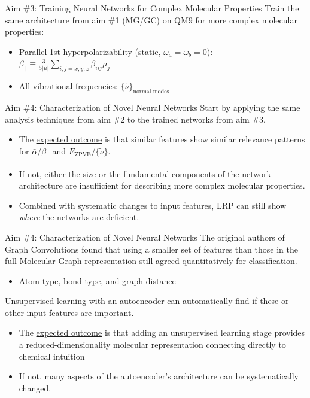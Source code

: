 \documentclass[xetex,compress]{beamer}
\begin{document}

\begin{frame}{Aim \#3: Training Neural Networks for Complex Molecular Properties}
  Train the same architecture from aim \#1 (MG/GC) on QM9 for more complex molecular properties:
  \begin{itemize}
  \item Parallel 1st hyperpolarizability (static, \(\omega_{a} = \omega_{b} = 0\)): \(\beta_{\parallel} \equiv \frac{3}{5|\mu|} \sum_{i,j=x,y,z} \beta_{iij} \mu_{j}\)
  \item All vibrational frequencies: \(\{\tilde{\nu}\}_{\text{normal modes}}\)
  \end{itemize}
\end{frame}

\begin{frame}{Aim \#4: Characterization of Novel Neural Networks}
  Start by applying the same analysis techniques from aim \#2 to the trained networks from aim \#3.
  \begin{itemize}
  \item The \underline{expected outcome} is that similar features show similar relevance patterns for \(\bar{\alpha}/\beta_{\parallel}\) and \(E_{\text{ZPVE}}/\{\tilde{\nu}\}\).
  \item If not, either the size or the fundamental components of the network architecture are insufficient for describing more complex molecular properties.
  \item Combined with systematic changes to input features, LRP can still show \emph{where} the networks are deficient.
  \end{itemize}
\end{frame}

\begin{frame}{Aim \#4: Characterization of Novel Neural Networks}
  The original authors of Graph Convolutions found that using a smaller set of features than those in the full Molecular Graph representation still agreed \underline{quantitatively} for classification.
  \begin{itemize}
  \item Atom type, bond type, and graph distance
  \end{itemize}
  Unsupervised learning with an autoencoder can automatically find if these or other input features are important.
  \begin{itemize}
  \item The \underline{expected outcome} is that adding an unsupervised learning stage provides a reduced-dimensionality molecular representation connecting directly to chemical intuition
  \item If not, many aspects of the autoencoder's architecture can be systematically changed.
  \end{itemize}
\end{frame}
\end{document}

